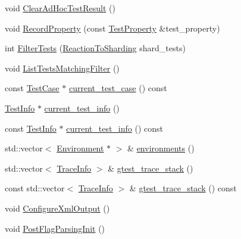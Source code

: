 \begin{DoxyCompactItemize}
\item 
void \hyperlink{classtesting_1_1internal_1_1_unit_test_impl_ac44629cc4fa12b788779d4aa76939510}{Clear\-Ad\-Hoc\-Test\-Result} ()
\item 
void \hyperlink{classtesting_1_1internal_1_1_unit_test_impl_a15e4af4df167d2504decbc8fcc108a6f}{Record\-Property} (const \hyperlink{classtesting_1_1_test_property}{Test\-Property} \&test\-\_\-property)
\item 
int \hyperlink{classtesting_1_1internal_1_1_unit_test_impl_abd47e447f0c2557ed528db0350671bed}{Filter\-Tests} (\hyperlink{classtesting_1_1internal_1_1_unit_test_impl_acc5ffd3f9bc2e87bb3dba4218f58af43}{Reaction\-To\-Sharding} shard\-\_\-tests)
\item 
void \hyperlink{classtesting_1_1internal_1_1_unit_test_impl_ad2cfedef41d3d29aad23c2c64214e6f3}{List\-Tests\-Matching\-Filter} ()
\item 
const \hyperlink{classtesting_1_1_test_case}{Test\-Case} $\ast$ \hyperlink{classtesting_1_1internal_1_1_unit_test_impl_a2f44db2fb6d9cf3d0c2a90d9efc87402}{current\-\_\-test\-\_\-case} () const 
\item 
\hyperlink{classtesting_1_1_test_info}{Test\-Info} $\ast$ \hyperlink{classtesting_1_1internal_1_1_unit_test_impl_a8d303ebdcf5989e96d3ed96fb7255102}{current\-\_\-test\-\_\-info} ()
\item 
const \hyperlink{classtesting_1_1_test_info}{Test\-Info} $\ast$ \hyperlink{classtesting_1_1internal_1_1_unit_test_impl_a6c90b6512125a43fba8d1be5f99dde1a}{current\-\_\-test\-\_\-info} () const 
\item 
std\-::vector$<$ \hyperlink{classtesting_1_1_environment}{Environment} $\ast$ $>$ \& \hyperlink{classtesting_1_1internal_1_1_unit_test_impl_aa1489e6a2378d64d68bc01963ea5db4a}{environments} ()
\item 
std\-::vector$<$ \hyperlink{structtesting_1_1internal_1_1_trace_info}{Trace\-Info} $>$ \& \hyperlink{classtesting_1_1internal_1_1_unit_test_impl_af8c7c0a0c954e36d83e6e4690d3fb938}{gtest\-\_\-trace\-\_\-stack} ()
\item 
const std\-::vector$<$ \hyperlink{structtesting_1_1internal_1_1_trace_info}{Trace\-Info} $>$ \& \hyperlink{classtesting_1_1internal_1_1_unit_test_impl_a1fa664f26839f3192f63afb502dee09d}{gtest\-\_\-trace\-\_\-stack} () const 
\item 
void \hyperlink{classtesting_1_1internal_1_1_unit_test_impl_a21cd7b2928de03a55b5252f29dd5ae6d}{Configure\-Xml\-Output} ()
\item 
void \hyperlink{classtesting_1_1internal_1_1_unit_test_impl_a772894193104b1b2516f16e6ff813168}{Post\-Flag\-Parsing\-Init} ()

\end{DoxyCompactItemize}
